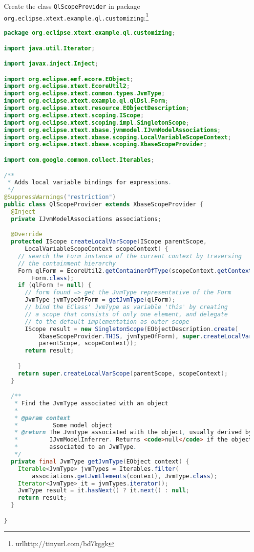 Create the class \texttt{QlScopeProvider} in package \texttt{org.eclipse.xtext.example.ql.customizing}:\footnote{url{http://tinyurl.com/bd7kggk}}
\begin{lstlisting}[language=Java]
package org.eclipse.xtext.example.ql.customizing;

import java.util.Iterator;

import javax.inject.Inject;

import org.eclipse.emf.ecore.EObject;
import org.eclipse.xtext.EcoreUtil2;
import org.eclipse.xtext.common.types.JvmType;
import org.eclipse.xtext.example.ql.qlDsl.Form;
import org.eclipse.xtext.resource.EObjectDescription;
import org.eclipse.xtext.scoping.IScope;
import org.eclipse.xtext.scoping.impl.SingletonScope;
import org.eclipse.xtext.xbase.jvmmodel.IJvmModelAssociations;
import org.eclipse.xtext.xbase.scoping.LocalVariableScopeContext;
import org.eclipse.xtext.xbase.scoping.XbaseScopeProvider;

import com.google.common.collect.Iterables;

/**
 * Adds local variable bindings for expressions.
 */
@SuppressWarnings("restriction")
public class QlScopeProvider extends XbaseScopeProvider {
  @Inject
  private IJvmModelAssociations associations;

  @Override
  protected IScope createLocalVarScope(IScope parentScope,
      LocalVariableScopeContext scopeContext) {
    // search the Form instance of the current context by traversing
    // the containment hierarchy
    Form qlForm = EcoreUtil2.getContainerOfType(scopeContext.getContext(),
        Form.class);
    if (qlForm != null) {
      // form found => get the JvmType representative of the Form
      JvmType jvmTypeOfForm = getJvmType(qlForm);
      // bind the EClass' JvmType as variable 'this' by creating
      // a scope that consists of only one element, and delegate
      // to the default implementation as outer scope
      IScope result = new SingletonScope(EObjectDescription.create(
          XbaseScopeProvider.THIS, jvmTypeOfForm), super.createLocalVarScope(
          parentScope, scopeContext));
      return result;

    }
    return super.createLocalVarScope(parentScope, scopeContext);
  }

  /**
   * Find the JvmType associated with an object
   * 
   * @param context
   *          Some model object
   * @return The JvmType associated with the object, usually derived by the
   *         IJvmModelInferrer. Returns <code>null</code> if the object is not
   *         associated to an JvmType.
   */
  private final JvmType getJvmType(EObject context) {
    Iterable<JvmType> jvmTypes = Iterables.filter(
        associations.getJvmElements(context), JvmType.class);
    Iterator<JvmType> it = jvmTypes.iterator();
    JvmType result = it.hasNext() ? it.next() : null;
    return result;
  }

}
\end{lstlisting}

